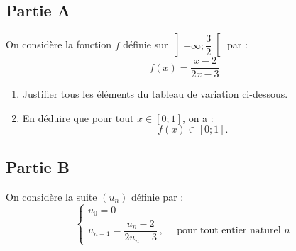 \subsection*{Partie  A}
On considère la fonction $f$ définie sur $\left]-\infty ; \dfrac{3}{2}\right [$ par : \[f(x)=\dfrac{x-2}{2 x-3}\]

	\begin{enumerate}
		\item Justifier tous les éléments du tableau de variation ci-dessous.
	\end{enumerate}

	\begin{center}
	\end{center}

	\begin{enumerate}
		\setcounter{enumi}{1}
		\item En déduire que pour tout $x \in[0 ; 1]$, on a :
		\[f(x) \in[0 ; 1].\]
	\end{enumerate}

\subsection*{Partie  B}
On considère la suite $(u_{n})$ définie par :
\[\begin{cases}
	u_{0}=0 \\
	u_{n+1}=\dfrac{u_{n}-2}{2 u_{n}-3}\, ,\quad \text { pour tout entier naturel } n
\end{cases}\]

